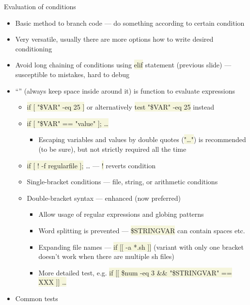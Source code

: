 \documentclass[compress, xelatex, 11pt, xcolor=svgnames, aspectratio=169, url={hyphens, lowtilde}]{beamer}
\renewcommand{\texttt}[1]{\colorbox{Beige}{{\ttfamily #1}}}
\begin{document}
\begin{frame}[allowframebreaks]{Evaluation of conditions}
	\begin{itemize}
		\item Basic method to branch code --- do something according to certain condition
		\item Very versatile, usually there are more options how to write desired conditioning
		\item Avoid long chaining of conditions using \texttt{elif} statement (previous slide) --- susceptible to mistakes, hard to debug
		\item \enquote{\texttt{[~\ldots~]}} (always keep space inside around it) is function to evaluate expressions
		\begin{itemize}
			\item \texttt{if [ "\$\textbraceleft VAR\textbraceright" -eq 25 ]} or alternatively \texttt{test "\$\textbraceleft VAR\textbraceright" -eq 25} instead
			\item \texttt{if [ "\$\textbraceleft VAR\textbraceright" == "value" ]; \ldots}
			\begin{itemize}
				\item Escaping variables and values by double quotes (\texttt{"\ldots"}) is recommended (to be sure), but not strictly required all the time
			\end{itemize}
			\item \texttt{if [ ! -f regularfile ];} \ldots{ }--- \texttt{!} reverts condition
			\item Single-bracket conditions --- file, string, or arithmetic conditions
			\item Double-bracket syntax --- enhanced (now preferred)
			\begin{itemize}
				\item Allow usage of regular expressions and globing patterns
				\item Word splitting is prevented --- \texttt{\$\textbraceleft STRINGVAR\textbraceright} can contain spaces etc.
				\item Expanding file names --- \texttt{if [[ -a *.sh ]]} (variant with only one bracket doesn't work when there are multiple sh files)
				\item More detailed test, e.g. \texttt{if [[ \$num -eq 3 \&\& "\$\textbraceleft STRINGVAR\textbraceright " == XXX ]] \ldots}
			\end{itemize}
		\end{itemize}
		\item Common tests
		\begin{itemize}

\end{itemize}
\end{itemize}
\end{frame}
\end{document}
